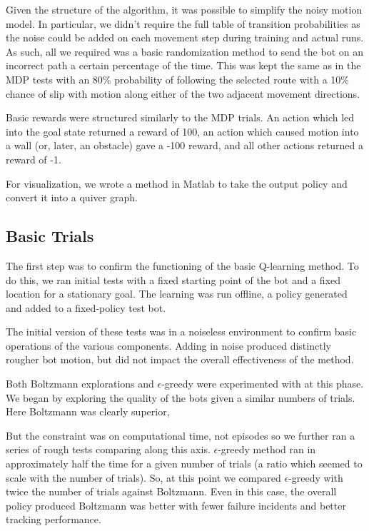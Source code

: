 \documentclass{aiaa-tc}%
\begin{document}
Given the structure of the algorithm, it was possible to simplify the
noisy motion model. In particular, we didn't require the full table of
transition probabilities as the noise could be added on each movement
step during training and actual runs. As such, all we required was a
basic randomization method to send the bot on an incorrect path a
certain percentage of the time. This was kept the same as in the MDP
tests with an 80\% probability of following the selected route with a
10\% chance of slip with motion along either of the two adjacent
movement directions.

Basic rewards were structured similarly to the MDP trials. An action
which led into the goal state returned a reward of 100, an action
which caused motion into a
wall (or, later, an obstacle) gave a -100 reward, and all other
actions returned a reward of -1.

For visualization, we wrote a method in Matlab to take the output
policy and convert it into a quiver graph.

\subsection{Basic Trials}

The first step was to confirm the functioning of the basic
Q-learning method. To do this, we ran initial tests with a fixed
starting point of the bot and a fixed location for a stationary
goal. The learning was run offline, a policy generated and added to a
fixed-policy test bot.

The initial version of these tests was in a noiseless environment to
confirm basic operations of the various components. Adding in noise
produced distinctly rougher bot motion, but did not impact the overall
effectiveness of the method.

Both Boltzmann explorations and $\epsilon$-greedy were experimented
with at this phase.  We began by exploring the quality of the bots
given a similar numbers of trials. Here Boltzmann was clearly
superior, 

But the constraint was on computational time, not episodes so we
further ran a series of rough tests comparing along this axis. $\epsilon$-greedy method ran in approximately half the
time for a given number of trials (a ratio which seemed to scale with
the number of trials). So, at this point we compared $\epsilon$-greedy
with twice the number of trials against Boltzmann. Even in this case,
the overall policy produced Boltzmann was better with fewer failure
incidents and better tracking performance.
\end{document}
